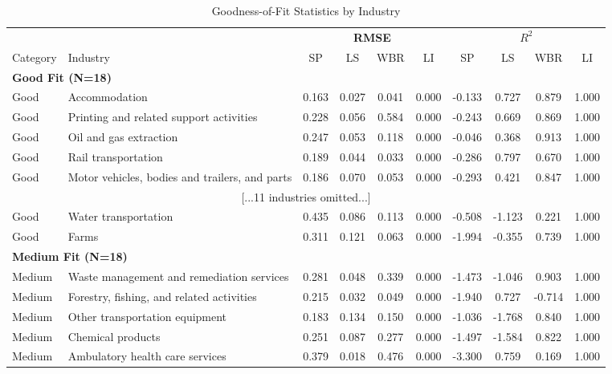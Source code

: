 \begin{landscape}
\begin{table}[H]
\caption{Goodness-of-Fit Statistics by Industry}
\label{tab:fit_statistics_by_industry}
\begin{center}
\tiny
\begin{tabular}{llcccc|cccc}
\toprule
& & \multicolumn{4}{c}{\textbf{RMSE}} & \multicolumn{4}{c}{\textbf{$R^2$}} \\
\cmidrule(lr){3-6} \cmidrule(lr){7-10}
Category & Industry & SP & LS & WBR & LI & SP & LS & WBR & LI \\
\midrule
\multicolumn{10}{l}{\textbf{Good Fit (N=18)}} \\
Good & Accommodation & 0.163 & 0.027 & 0.041 & 0.000 & -0.133 & 0.727 & 0.879 & 1.000 \\
Good & Printing and related support activities & 0.228 & 0.056 & 0.584 & 0.000 & -0.243 & 0.669 & 0.869 & 1.000 \\
Good & Oil and gas extraction & 0.247 & 0.053 & 0.118 & 0.000 & -0.046 & 0.368 & 0.913 & 1.000 \\
Good & Rail transportation & 0.189 & 0.044 & 0.033 & 0.000 & -0.286 & 0.797 & 0.670 & 1.000 \\
Good & Motor vehicles, bodies and trailers, and parts & 0.186 & 0.070 & 0.053 & 0.000 & -0.293 & 0.421 & 0.847 & 1.000 \\
\multicolumn{10}{c}{[...11 industries omitted...]} \\
Good & Water transportation & 0.435 & 0.086 & 0.113 & 0.000 & -0.508 & -1.123 & 0.221 & 1.000 \\
Good & Farms & 0.311 & 0.121 & 0.063 & 0.000 & -1.994 & -0.355 & 0.739 & 1.000 \\
\midrule
\multicolumn{10}{l}{\textbf{Medium Fit (N=18)}} \\
Medium & Waste management and remediation services & 0.281 & 0.048 & 0.339 & 0.000 & -1.473 & -1.046 & 0.903 & 1.000 \\
Medium & Forestry, fishing, and related activities & 0.215 & 0.032 & 0.049 & 0.000 & -1.940 & 0.727 & -0.714 & 1.000 \\
Medium & Other transportation equipment & 0.183 & 0.134 & 0.150 & 0.000 & -1.036 & -1.768 & 0.840 & 1.000 \\
Medium & Chemical products & 0.251 & 0.087 & 0.277 & 0.000 & -1.497 & -1.584 & 0.822 & 1.000 \\
Medium & Ambulatory health care services & 0.379 & 0.018 & 0.476 & 0.000 & -3.300 & 0.759 & 0.169 & 1.000 \\

\end{tabular}
\end{center}
\end{table}
\end{landscape}
